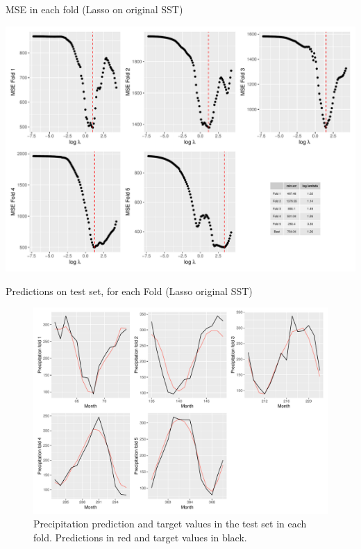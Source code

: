 \documentclass[
  ignorenonframetext,
]{beamer}
\begin{document}
\begin{frame}{MSE in each fold (Lasso on original SST)}
\protect\hypertarget{mse-in-each-fold-lasso-on-original-sst}{}
\begin{center}\includegraphics[width=0.75\linewidth]{ma-presentation_files/figure-beamer/unnamed-chunk-34-1} \end{center}
\end{frame}

\begin{frame}{Predictions on test set, for each Fold (Lasso original
SST)}
\protect\hypertarget{predictions-on-test-set-for-each-fold-lasso-original-sst}{}
\begin{figure}

{\centering \includegraphics[width=0.75\linewidth]{ma-presentation_files/figure-beamer/pred-plot-fold-lasso-og-1} 

}

\caption{Precipitation prediction and target values in the test set in each fold. Predictions in red and target values in black.}\label{fig:pred-plot-fold-lasso-og}
\end{figure}
\end{frame}
\end{document}
